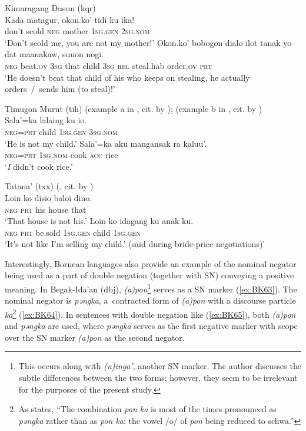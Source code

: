 \documentclass[output=paper,draft,draftmode,colorlinks,citecolor=brown]{langscibook}
\begin{document}
\ea Kimaragang Dusun (kqr) \citep[7--8]{kroeger2014a} \label{ex:BK60}\\
  \ea\label{ex:BK60a}
	\gll Kada		matagur,	okon.ko’		tidi		ku			ika!\\
	don’t		scold			\textsc{neg}			mother	\textsc{1sg.gen}	\textsc{2sg.nom}\\
	\glt `Don’t scold me, you are not my mother!'
  \ex\label{ex:BK60b}
	\gll Okon.ko’	bobogon			dialo		ilot	tanak		yo	dat		maanakaw,		suuon		nogi.\\
	\textsc{neg}			beat.\textsc{ov}			\textsc{3sg}		that	child		\textsc{3sg}	\textsc{rel}	steal.hab		order.\textsc{ov}		\textsc{prt}\\
	\glt `He doesn’t beat that child of his who keeps on stealing, he actually orders / sends him (to steal)!'
\z \z

\ea Timugon Murut (tih) (example a in \citealp[10]{brewis1988a}, cit. by \citealp[8]{kroeger2014a}); (example b in \citealp[612]{brewis2004a}, cit. by \citealp[8]{kroeger2014a}) \label{ex:BK61}\\
  \ea
	\gll Sala’=ka	lalaing	ku				io.\\
	\textsc{neg=prt}	child		\textsc{1sg.gen}		\textsc{3sg.nom}\\
	\glt `He is not my child.'
  \ex
	\gll Sala’=ka	aku			mangansak		ra		kaluu’.\\
	\textsc{neg=prt}	\textsc{1sg.nom}	cook				\textsc{acc}	rice\\
	\glt `\textit{I} didn’t cook rice.'
\z \z

\ea Tatana’ (txx) (\citealp[6, 44]{chan1989a}, cit. by \citealp[11]{kroeger2014a}) \label{ex:BK62}\\
  \ea
	\gll Loin	ko			disio	baloi		dino.\\
	\textsc{neg}	\textsc{prt}	his		house		that\\
	\glt `That house is not his.'
  \ex
	\gll Loin	ko			idagang	ku				anak	ku.\\
	\textsc{neg}	\textsc{prt}	be.sold	\textsc{1sg.gen}		child	\textsc{1sg.gen}\\
	\glt `It’s not like I’m selling my child.’ (said during bride-price negotiations)'
\z \z

Interestingly, Bornean languages also provide an example of the nominal negator being used as a part of double negation (together with SN) conveying a positive meaning. In Begak-Ida’an (dbj), \textit{(a)pon}\footnote{This occurs along with \textit{(n)inga’}, another SN marker. The author discusses the subtle differences between the two forms; however, they seem to be irrelevant for the purposes of the present study.} serves as a SN marker (\ref{ex:BK63}). The nominal negator is \textit{pǝngka}, a contracted form of \textit{(a)pon} with a discourse particle \textit{ka}\footnote{As \citet[304]{goudswaard2005a} states, “The combination \textit{pon ka} is most of the times pronounced as \textit{pǝngka} rather than as \textit{pon ka}: the vowel /o/ of \textit{pon} being reduced to schwa.”} (\ref{ex:BK64}). In sentences with double negation like (\ref{ex:BK65}), both \textit{(a)pon} and \textit{pǝngka} are used, where \textit{pǝngka} serves as the first negative marker with scope over the SN marker \textit{(a)pon} as the second negator.
\end{document}
